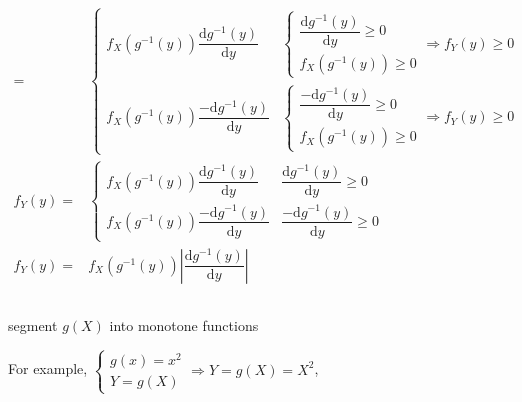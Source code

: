 \documentclass[
]{book}
\theoremstyle{definition}
\theoremstyle{definition}
\theoremstyle{definition}
\theoremstyle{definition}
\theoremstyle{remark}
\begin{document}
\[\begin{aligned}
= & \begin{cases}
f_{{\scriptscriptstyle X}}\left(g^{-1}\left(y\right)\right)\dfrac{\mathrm{d}g^{-1}\left(y\right)}{\mathrm{d}y} & \begin{cases}
\dfrac{\mathrm{d}g^{-1}\left(y\right)}{\mathrm{d}y}\ge0\\
f_{{\scriptscriptstyle X}}\left(g^{-1}\left(y\right)\right)\ge0
\end{cases}\Rightarrow f_{{\scriptscriptstyle Y}}\left(y\right)\ge0\\
f_{{\scriptscriptstyle X}}\left(g^{-1}\left(y\right)\right)\dfrac{-\mathrm{d}g^{-1}\left(y\right)}{\mathrm{d}y} & \begin{cases}
\dfrac{-\mathrm{d}g^{-1}\left(y\right)}{\mathrm{d}y}\ge0\\
f_{{\scriptscriptstyle X}}\left(g^{-1}\left(y\right)\right)\ge0
\end{cases}\Rightarrow f_{{\scriptscriptstyle Y}}\left(y\right)\ge0
\end{cases}\\
f_{{\scriptscriptstyle Y}}\left(y\right)= & \begin{cases}
f_{{\scriptscriptstyle X}}\left(g^{-1}\left(y\right)\right)\dfrac{\mathrm{d}g^{-1}\left(y\right)}{\mathrm{d}y} & \dfrac{\mathrm{d}g^{-1}\left(y\right)}{\mathrm{d}y}\ge0\\
f_{{\scriptscriptstyle X}}\left(g^{-1}\left(y\right)\right)\dfrac{-\mathrm{d}g^{-1}\left(y\right)}{\mathrm{d}y} & \dfrac{-\mathrm{d}g^{-1}\left(y\right)}{\mathrm{d}y}\ge0
\end{cases}\\
f_{{\scriptscriptstyle Y}}\left(y\right)= & f_{{\scriptscriptstyle X}}\left(g^{-1}\left(y\right)\right)\left|\dfrac{\mathrm{d}g^{-1}\left(y\right)}{\mathrm{d}y}\right|
\end{aligned}
\]

\[
\tag*{$\Box$}
\]

segment \(g\left(X\right)\) into monotone functions

For example, \(\begin{cases}
g\left(x\right)=x^{2}\\
Y=g\left(X\right)
\end{cases}\Rightarrow Y=g\left(X\right)=X^{2}\),
\end{document}

